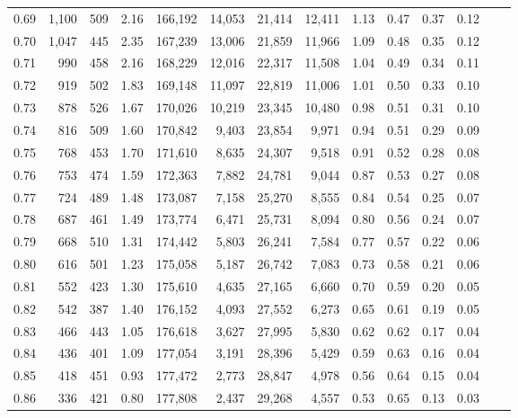 \begin{tabular}{rrrrrrrrrrrrrr}
0.69 &  1,100 &  509 &    2.16 &  166,192 &   14,053 &  21,414 &  12,411 &  1.13 &  0.47 &  0.37 &      0.12 \\
0.70 &  1,047 &  445 &    2.35 &  167,239 &   13,006 &  21,859 &  11,966 &  1.09 &  0.48 &  0.35 &      0.12 \\
0.71 &    990 &  458 &    2.16 &  168,229 &   12,016 &  22,317 &  11,508 &  1.04 &  0.49 &  0.34 &      0.11 \\
0.72 &    919 &  502 &    1.83 &  169,148 &   11,097 &  22,819 &  11,006 &  1.01 &  0.50 &  0.33 &      0.10 \\
0.73 &    878 &  526 &    1.67 &  170,026 &   10,219 &  23,345 &  10,480 &  0.98 &  0.51 &  0.31 &      0.10 \\
0.74 &    816 &  509 &    1.60 &  170,842 &    9,403 &  23,854 &   9,971 &  0.94 &  0.51 &  0.29 &      0.09 \\
0.75 &    768 &  453 &    1.70 &  171,610 &    8,635 &  24,307 &   9,518 &  0.91 &  0.52 &  0.28 &      0.08 \\
0.76 &    753 &  474 &    1.59 &  172,363 &    7,882 &  24,781 &   9,044 &  0.87 &  0.53 &  0.27 &      0.08 \\
0.77 &    724 &  489 &    1.48 &  173,087 &    7,158 &  25,270 &   8,555 &  0.84 &  0.54 &  0.25 &      0.07 \\
0.78 &    687 &  461 &    1.49 &  173,774 &    6,471 &  25,731 &   8,094 &  0.80 &  0.56 &  0.24 &      0.07 \\
0.79 &    668 &  510 &    1.31 &  174,442 &    5,803 &  26,241 &   7,584 &  0.77 &  0.57 &  0.22 &      0.06 \\
0.80 &    616 &  501 &    1.23 &  175,058 &    5,187 &  26,742 &   7,083 &  0.73 &  0.58 &  0.21 &      0.06 \\
0.81 &    552 &  423 &    1.30 &  175,610 &    4,635 &  27,165 &   6,660 &  0.70 &  0.59 &  0.20 &      0.05 \\
0.82 &    542 &  387 &    1.40 &  176,152 &    4,093 &  27,552 &   6,273 &  0.65 &  0.61 &  0.19 &      0.05 \\
0.83 &    466 &  443 &    1.05 &  176,618 &    3,627 &  27,995 &   5,830 &  0.62 &  0.62 &  0.17 &      0.04 \\
0.84 &    436 &  401 &    1.09 &  177,054 &    3,191 &  28,396 &   5,429 &  0.59 &  0.63 &  0.16 &      0.04 \\
0.85 &    418 &  451 &    0.93 &  177,472 &    2,773 &  28,847 &   4,978 &  0.56 &  0.64 &  0.15 &      0.04 \\
0.86 &    336 &  421 &    0.80 &  177,808 &    2,437 &  29,268 &   4,557 &  0.53 &  0.65 &  0.13 &      0.03 \\

\end{tabular}
